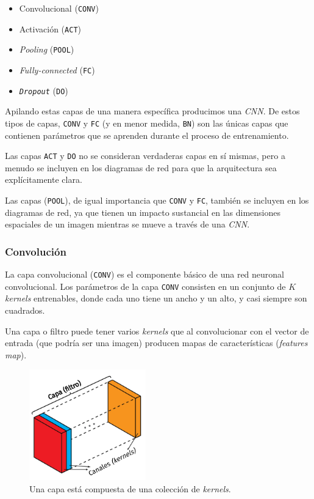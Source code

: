 \documentclass[a4paper,12pt]{article}
\begin{document}
\begin{itemize}[noitemsep, topsep=2pt]
	\item Convolucional (\texttt{CONV})
	\item Activación (\texttt{ACT})
	\item \textit{Pooling} (\texttt{POOL})
	\item \textit{Fully-connected} (\texttt{FC})
	\item \texttt{\textit{Dropout}} (\texttt{DO})
\end{itemize}

Apilando estas capas de una manera específica producimos una \textit{CNN}. De estos tipos de capas, \texttt{CONV} y \texttt{FC} (y en menor medida, \texttt{BN}) son las únicas capas que contienen parámetros que se aprenden durante el proceso de entrenamiento.

Las capas \texttt{ACT} y \texttt{DO} no se consideran verdaderas capas en sí mismas, pero a menudo se incluyen en los diagramas de red para que la arquitectura sea explícitamente clara.

Las capas (\texttt{POOL}), de igual importancia que \texttt{CONV} y \texttt{FC}, también se incluyen en los diagramas de red, ya que tienen un impacto sustancial en las dimensiones espaciales de un
imagen mientras se mueve a través de una \textit{CNN}.

\subsubsection{Convolución}

La capa convolucional (\texttt{CONV}) es el componente básico de una red neuronal convolucional. Los parámetros de la capa \texttt{CONV} consisten en un conjunto de $K$ \textit{kernels} entrenables, donde cada uno tiene un ancho y un alto, y casi siempre son cuadrados. 

Una capa o filtro puede tener varios \textit{kernels} que al convolucionar con el vector de entrada (que podría ser una imagen) producen mapas de características (\textit{features map}).

\begin{figure}[H]
	\begin{center}				
		\includegraphics[width=0.45\textwidth]{layer-kernels.png}
		\caption{Una capa está compuesta de una colección de \textit{kernels}.}
		\label{fig:layer-kernel}
	\end{center}
\end{figure}
\end{document}
